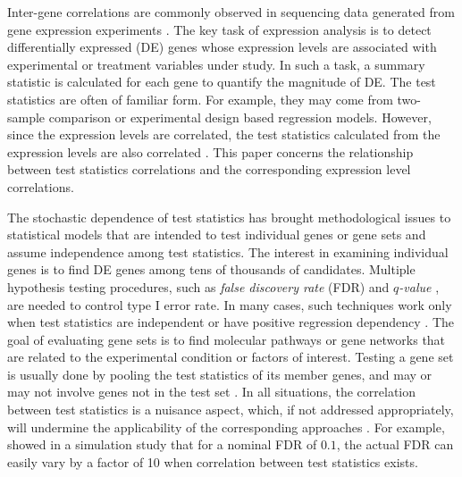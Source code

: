 	Inter-gene correlations are commonly observed in sequencing data generated from gene expression 
	experiments \citep{efron2012large1, gatti2010heading, 
	huang2013gene,qiu2005effects,storey2003positive}.
	The key task of expression analysis is to detect differentially expressed (DE) genes whose 
	expression levels are associated with experimental or treatment variables under study. 
	In such a task, 
	a summary statistic is calculated for each gene to quantify the magnitude of DE. The test 
	statistics are often of familiar form. For example, 
	they may come from two-sample comparison or experimental design based regression models. 
	However, since the expression levels are correlated, the test statistics calculated from the 
	expression levels are also correlated \citep{barry2008statistical, efron2007correlation, 
		wu2012camera}. This paper concerns the relationship between test 
	statistics correlations and the corresponding expression level correlations.
	
	The stochastic dependence of test statistics has brought methodological issues to statistical 
	models that are intended to test individual genes or gene sets and assume independence among 
	test statistics. The interest in examining individual genes is to find DE genes among tens of 
	thousands of candidates. Multiple hypothesis testing 
	procedures, such as \textit{false discovery rate} (FDR) \citep{benjamini1995controlling} and 
	\textit{$q$-value} \citep{storey2003positive}, 
	are needed to control type I error rate. In many cases, such techniques work only 
	when test statistics are independent \citep{benjamini1995controlling} or 
	have positive regression dependency \citep{benjamini2001control}. The goal of evaluating gene 
	sets is to find molecular pathways or gene 
	networks that are related to the experimental condition or factors of interest. Testing a gene 
	set is usually done by pooling the test 
	statistics of its member genes, and may or may not involve genes not in the test set 
	\citep{goeman2007analyzing}. In all situations, the 
	correlation between test statistics is a nuisance aspect, which, if not addressed 
	appropriately, will undermine the applicability of the 
	corresponding approaches \citep{gatti2010heading, wu2012camera}. For
	example, \citet{efron2007correlation} showed in a simulation study that for a nominal FDR of 
	$0.1$, the actual FDR can easily vary by a factor of 10 when correlation between test 
	statistics 
	exists. 
	
